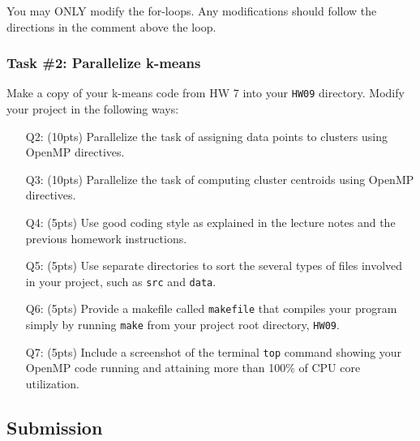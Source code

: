 \begin{tcolorbox}[width=\textwidth,colback=pink]
You may ONLY modify the for-loops.
Any modifications should follow the directions in the comment above the loop.
\end{tcolorbox}

\newpage

\subsubsection*{Task \#2: Parallelize k-means}
Make a copy of your k-means code from HW 7 into your \texttt{HW09} directory.
Modify your project in the following ways:
\begin{itemize}
    \item[Q2:] (10pts) Parallelize the task of assigning data points to clusters using OpenMP directives.
    \item[Q3:] (10pts) Parallelize the task of computing cluster centroids  using OpenMP directives.
    \item[Q4:] (5pts) Use good coding style as explained in the lecture notes and the previous homework instructions.
    \item[Q5:] (5pts) Use separate directories to sort the several types of files involved in your project, such as \texttt{src} and \texttt{data}.
    \item[Q6:] (5pts) Provide a makefile called \texttt{makefile} that compiles your program simply by running \texttt{make} from your project root directory, \texttt{HW09}.
    \item[Q7:] (5pts) Include a screenshot of the terminal \texttt{top} command showing your OpenMP code running and attaining more than 100\% of CPU core utilization.
\end{itemize}

\subsection*{Submission}


